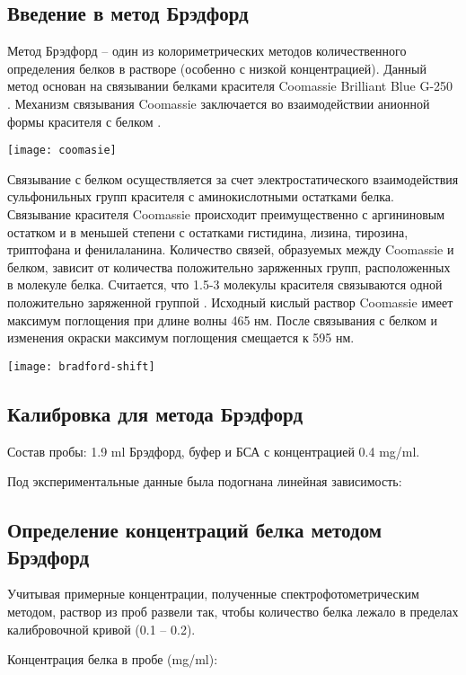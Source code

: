 \subsection{Введение в метод Брэдфорд}
Метод Брэдфорд -- один из колориметрических методов количественного определения белков в растворе
(особенно с низкой концентрацией).
Данный метод основан на связывании белками красителя Coomassie Brilliant Blue G-250 \cite{bradford-1}.
Механизм связывания Coomassie заключается во взаимодействии анионной формы красителя с белком \cite{bradford-2}.

\texttt{[image: coomasie]}

Связывание с белком осуществляется за счет электростатического взаимодействия сульфонильных групп
красителя с аминокислотными остатками белка.
Связывание красителя Coomassie происходит преимущественно с аргининовым остатком и в меньшей степени с
остатками гистидина, лизина, тирозина, триптофана и фенилаланина.
Количество связей, образуемых между Coomassie и белком, зависит от количества положительно заряженных групп,
расположенных в молекуле белка.
Считается, что 1.5-3 молекулы красителя связываются одной положительно заряженной группой \cite{bradford-3}.
Исходный кислый раствор Coomassie имеет максимум поглощения при длине волны 465 нм.
После связывания с белком и изменения окраски максимум поглощения смещается к 595 нм.

\texttt{[image: bradford-shift]}

\subsection{Калибровка для метода Брэдфорд}
\label{A0k}

Состав пробы: 1.9 ml Брэдфорд, буфер и БСА с концентрацией 0.4 mg/ml.

Под экспериментальные данные была подогнана линейная зависимость:



\subsection{Определение концентраций белка методом Брэдфорд}

Учитывая примерные концентрации, полученные спектрофотометрическим методом,
раствор из проб развели так, чтобы количество белка лежало в пределах
калибровочной кривой (0.1 -- 0.2).

Концентрация белка в пробе (mg/ml):

